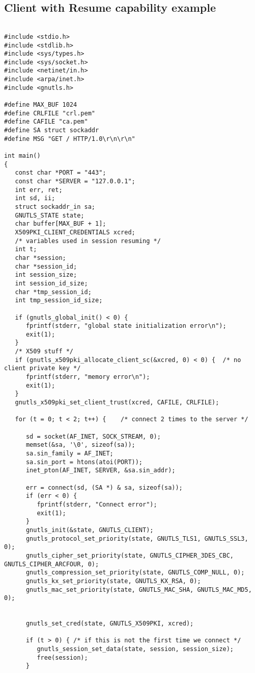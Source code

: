 \subsection{Client with Resume capability example}
\label{resume-example}
\begin{verbatim}

#include <stdio.h>
#include <stdlib.h>
#include <sys/types.h>
#include <sys/socket.h>
#include <netinet/in.h>
#include <arpa/inet.h>
#include <gnutls.h>

#define MAX_BUF 1024
#define CRLFILE "crl.pem"
#define CAFILE "ca.pem"
#define SA struct sockaddr
#define MSG "GET / HTTP/1.0\r\n\r\n"

int main()
{
   const char *PORT = "443";
   const char *SERVER = "127.0.0.1";
   int err, ret;
   int sd, ii;
   struct sockaddr_in sa;
   GNUTLS_STATE state;
   char buffer[MAX_BUF + 1];
   X509PKI_CLIENT_CREDENTIALS xcred;
   /* variables used in session resuming */
   int t;
   char *session;
   char *session_id;
   int session_size;
   int session_id_size;
   char *tmp_session_id;
   int tmp_session_id_size;

   if (gnutls_global_init() < 0) {
      fprintf(stderr, "global state initialization error\n");
      exit(1);
   }
   /* X509 stuff */
   if (gnutls_x509pki_allocate_client_sc(&xcred, 0) < 0) {  /* no client private key */
      fprintf(stderr, "memory error\n");
      exit(1);
   }
   gnutls_x509pki_set_client_trust(xcred, CAFILE, CRLFILE);

   for (t = 0; t < 2; t++) {    /* connect 2 times to the server */

      sd = socket(AF_INET, SOCK_STREAM, 0);
      memset(&sa, '\0', sizeof(sa));
      sa.sin_family = AF_INET;
      sa.sin_port = htons(atoi(PORT));
      inet_pton(AF_INET, SERVER, &sa.sin_addr);

      err = connect(sd, (SA *) & sa, sizeof(sa));
      if (err < 0) {
         fprintf(stderr, "Connect error");
         exit(1);
      }
      gnutls_init(&state, GNUTLS_CLIENT);
      gnutls_protocol_set_priority(state, GNUTLS_TLS1, GNUTLS_SSL3, 0);
      gnutls_cipher_set_priority(state, GNUTLS_CIPHER_3DES_CBC, GNUTLS_CIPHER_ARCFOUR, 0);
      gnutls_compression_set_priority(state, GNUTLS_COMP_NULL, 0);
      gnutls_kx_set_priority(state, GNUTLS_KX_RSA, 0);
      gnutls_mac_set_priority(state, GNUTLS_MAC_SHA, GNUTLS_MAC_MD5, 0);


      gnutls_set_cred(state, GNUTLS_X509PKI, xcred);

      if (t > 0) { /* if this is not the first time we connect */
         gnutls_session_set_data(state, session, session_size);
         free(session);
      }
      

\end{verbatim}
